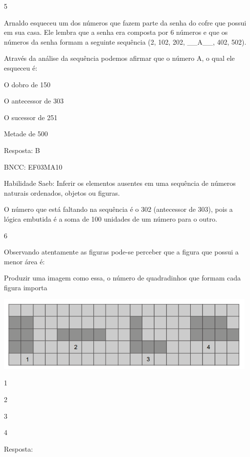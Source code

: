 \begin{escolha}
{\begin{escolha}
{\num{5}

Arnaldo esqueceu um dos números que fazem parte da senha do cofre que
possui em sua casa. Ele lembra que a senha era composta por 6 números e
que os números da senha formam a seguinte sequência (2, 102, 202,
\_\_A\_\_, 402, 502).

Através da análise da sequência podemos afirmar que o número A, o qual
ele esqueceu é:

\begin{escolha}

\item
  O dobro de 150
\item
  O antecessor de 303
\item
  O sucessor de 251
\item
  Metade de 500
\end{escolha}

Resposta: B

BNCC: EF03MA10

Habilidade Saeb: Inferir os elementos ausentes em uma sequência de
números naturais ordenados, objetos ou figuras.

O número que está faltando na sequência é o 302 (antecessor de 303),
pois a lógica embutida é a soma de 100 unidades de um número para o
outro.

\num{6}

Observando atentamente as figuras pode-se perceber que a figura que
possui a menor área é:

Produzir uma imagem como essa, o número de quadradinhos que formam cada
figura importa

\includegraphics[width=5.12179in,height=1.48342in]{media/image133.png}

\begin{escolha}

\item
  1
\item
  2
\item
  3
\item
  4
\end{escolha}

Resposta:

}
\end{escolha}}
\end{escolha}
